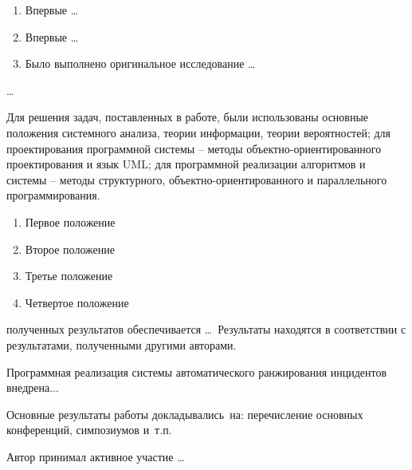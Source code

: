 {\novelty}
\begin{enumerate}
  \item Впервые \ldots
  \item Впервые \ldots
  \item Было выполнено оригинальное исследование \ldots
\end{enumerate}

{\influence} \ldots

{\methods} Для решения задач, поставленных в работе, были использованы основные положения системного анализа, теории информации, теории вероятностей; для проектирования программной системы – методы объектно-ориентированного проектирования и язык UML; для программной реализации алгоритмов и системы – методы структурного, объектно-ориентированного и параллельного программирования.

{}
\begin{enumerate}
  \item Первое положение
  \item Второе положение
  \item Третье положение
  \item Четвертое положение
\end{enumerate}

{\reliability} полученных результатов обеспечивается \ldots \ Результаты находятся в соответствии с результатами, полученными другими авторами.



Программная реализация системы автоматического ранжирования инцидентов внедрена...

{\probation}
Основные результаты работы докладывались~на:
перечисление основных конференций, симпозиумов и~т.\:п.

{\contribution} Автор принимал активное участие \ldots


